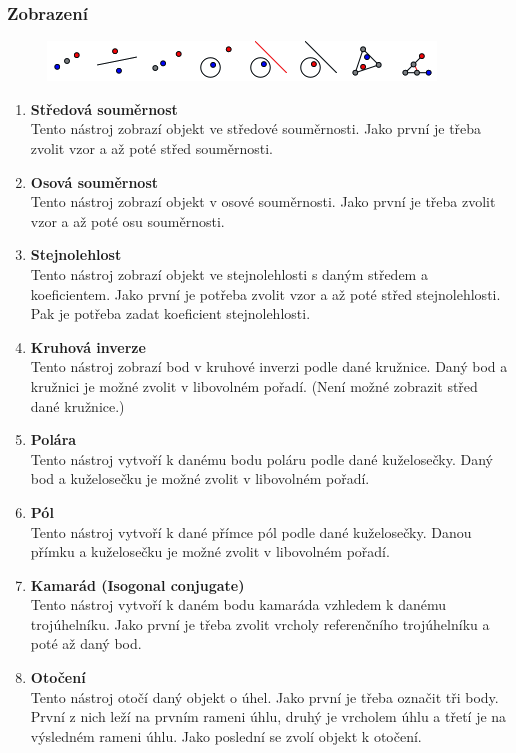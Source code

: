 \documentclass[11pt]{article}
\begin{document}
    \subsubsection{Zobrazení}
    \vspace{-10pt}
    \begin{figure}[h]
        \begin{center}
        \includegraphics[scale=0.5]{imgs/transform_tools.png}
        \end{center}
    \end{figure}
    \vspace{-25pt}
    \begin{enumerate}
        \item{\bf Středová souměrnost}\\
        Tento nástroj zobrazí objekt ve středové souměrnosti. Jako první je třeba zvolit vzor a až poté střed souměrnosti.
        \item{\bf Osová souměrnost}\\
        Tento nástroj zobrazí objekt v osové souměrnosti. Jako první je třeba zvolit vzor a až poté osu souměrnosti.
        \item{\bf Stejnolehlost}\\
        Tento nástroj zobrazí objekt ve stejnolehlosti s daným středem a koeficientem. Jako první je potřeba zvolit vzor a až poté střed stejnolehlosti. Pak je potřeba zadat koeficient stejnolehlosti.
        \item{\bf Kruhová inverze}\\
        Tento nástroj zobrazí bod v kruhové inverzi podle dané kružnice. Daný bod a kružnici je možné zvolit v libovolném pořadí. (Není možné zobrazit střed dané kružnice.)
        \item{\bf Polára}\\
        Tento nástroj vytvoří k danému bodu poláru podle dané kuželosečky. Daný bod a kuželosečku je možné zvolit v libovolném pořadí.
        \item{\bf Pól}\\
        Tento nástroj vytvoří k dané přímce pól podle dané kuželosečky. Danou přímku a kuželosečku je možné zvolit v libovolném pořadí.
        \item{\bf Kamarád (Isogonal conjugate)}\\
        Tento nástroj vytvoří k daném bodu kamaráda vzhledem k danému trojúhelníku. Jako první je třeba zvolit vrcholy referenčního trojúhelníku a poté až daný bod.
        \item{\bf Otočení}\\
        Tento nástroj otočí daný objekt o úhel. Jako první je třeba označit tři body. První z nich leží na prvním rameni úhlu, druhý je vrcholem úhlu a třetí je na výsledném rameni úhlu. Jako poslední se zvolí objekt k otočení.
    \end{enumerate}
\end{document}
